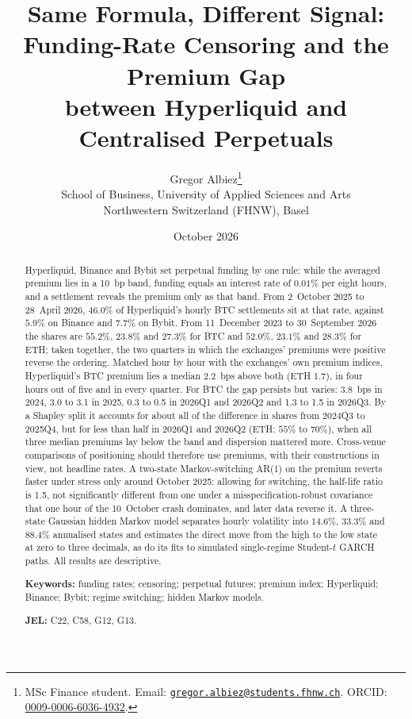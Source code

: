 \documentclass[10pt,a4paper]{article}
\title{\Large\bfseries Same Formula, Different Signal:\\[0.3em]
       \large Funding-Rate Censoring and the Premium Gap\\ between Hyperliquid and Centralised Perpetuals}
\author{Gregor Albiez\thanks{MSc Finance student. Email: \href{mailto:gregor.albiez@students.fhnw.ch}{\nolinkurl{gregor.albiez@students.fhnw.ch}}. ORCID: \href{https://orcid.org/0009-0006-6036-4932}{0009-0006-6036-4932}.}\\[0.45em]
  \normalsize School of Business, University of Applied Sciences and Arts\\
  \normalsize Northwestern Switzerland (FHNW), Basel}
\date{October 2026}
\begin{document}
\maketitle

\begin{abstract}
\noindent Hyperliquid, Binance and Bybit set perpetual funding by one rule: while the averaged premium lies in a 10~bp band, funding equals an interest rate of $0.01\%$ per eight hours, and a settlement reveals the premium only as that band. From 2~October 2025 to 28~April 2026, $46.0\%$ of Hyperliquid's hourly BTC settlements sit at that rate, against $5.9\%$ on Binance and $7.7\%$ on Bybit. From 11~December 2023 to 30~September 2026 the shares are $55.2\%$, $23.8\%$ and $27.3\%$ for BTC and $52.0\%$, $23.1\%$ and $28.3\%$ for ETH; taken together, the two quarters in which the exchanges' premiums were positive reverse the ordering. Matched hour by hour with the exchanges' own premium indices, Hyperliquid's BTC premium lies a median 2.2~bps above both (ETH 1.7), in four hours out of five and in every quarter. For BTC the gap persists but varies: 3.8~bps in 2024, 3.0 to 3.1 in 2025, 0.3 to 0.5 in 2026Q1 and 2026Q2 and 1.3 to 1.5 in 2026Q3. By a Shapley split it accounts for about all of the difference in shares from 2024Q3 to 2025Q4, but for less than half in 2026Q1 and 2026Q2 (ETH: $55\%$ to $70\%$), when all three median premiums lay below the band and dispersion mattered more. Cross-venue comparisons of positioning should therefore use premiums, with their constructions in view, not headline rates. A two-state Markov-switching AR(1) on the premium reverts faster under stress only around October 2025: allowing for switching, the half-life ratio is 1.5, not significantly different from one under a misspecification-robust covariance that one hour of the 10~October crash dominates, and later data reverse it. A three-state Gaussian hidden Markov model separates hourly volatility into $14.6\%$, $33.3\%$ and $88.4\%$ annualised states and estimates the direct move from the high to the low state at zero to three decimals, as do its fits to simulated single-regime Student-$t$ GARCH paths. All results are descriptive.

\medskip
\noindent\textbf{Keywords:} funding rates; censoring; perpetual futures; premium index; Hyperliquid; Binance; Bybit; regime switching; hidden Markov models.

\noindent\textbf{JEL:} C22, C58, G12, G13.
\end{abstract}
\end{document}
